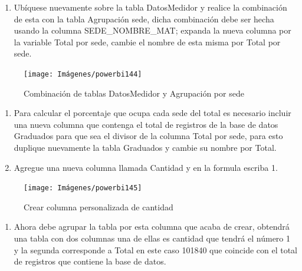 \documentclass[
]{book}
\providecommand{\tightlist}{%
  \setlength{\itemsep}{0pt}\setlength{\parskip}{0pt}}
\begin{document}
\begin{enumerate}
\def\labelenumi{\arabic{enumi}.}
\setcounter{enumi}{11}
\tightlist
\item
  Ubíquese nuevamente sobre la tabla DatosMedidor y realice la combinación de esta con la tabla Agrupación sede, dicha combinación debe ser hecha usando la columna SEDE\_NOMBRE\_MAT; expanda la nueva columna por la variable Total por sede, cambie el nombre de esta misma por Total por sede.
\end{enumerate}

\begin{figure}

{\centering \texttt{[image: Imágenes/powerbi144]} 

}

\caption{Combinación de tablas DatosMedidor y Agrupación por sede}\label{fig:combinaciondatosmedidoryagrupacionsede-fig}
\end{figure}

\begin{enumerate}
\def\labelenumi{\arabic{enumi}.}
\setcounter{enumi}{12}
\item
  Para calcular el porcentaje que ocupa cada sede del total es necesario incluir una nueva columna que contenga el total de registros de la base de datos Graduados para que sea el divisor de la columna Total por sede, para esto duplique nuevamente la tabla Graduados y cambie su nombre por Total.
\item
  Agregue una nueva columna llamada Cantidad y en la formula escriba 1.
\end{enumerate}

\begin{figure}

{\centering \texttt{[image: Imágenes/powerbi145]} 

}

\caption{Crear columna personalizada de cantidad}\label{fig:crearcolumnacantidadentotal-fig}
\end{figure}

\begin{enumerate}
\def\labelenumi{\arabic{enumi}.}
\setcounter{enumi}{14}
\tightlist
\item
  Ahora debe agrupar la tabla por esta columna que acaba de crear, obtendrá una tabla con dos columnas una de ellas es cantidad que tendrá el número 1 y la segunda corresponde a Total en este caso 101840 que coincide con el total de registros que contiene la base de datos.
\end{enumerate}
\end{document}
